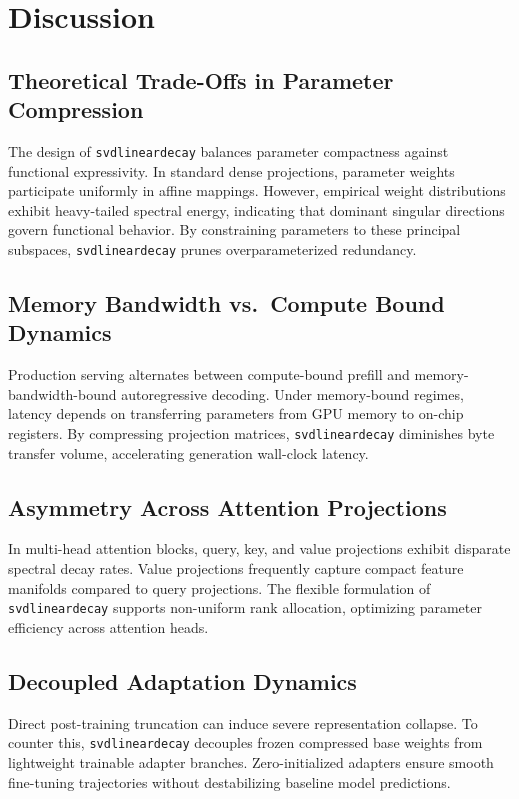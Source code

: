 \section{Discussion}

\subsection{Theoretical Trade-Offs in Parameter Compression}
The design of \texttt{svdlineardecay} balances parameter compactness against functional expressivity. In standard dense projections, parameter weights participate uniformly in affine mappings. However, empirical weight distributions exhibit heavy-tailed spectral energy, indicating that dominant singular directions govern functional behavior. By constraining parameters to these principal subspaces, \texttt{svdlineardecay} prunes overparameterized redundancy.

\subsection{Memory Bandwidth vs.\ Compute Bound Dynamics}
Production serving alternates between compute-bound prefill and memory-bandwidth-bound autoregressive decoding. Under memory-bound regimes, latency depends on transferring parameters from GPU memory to on-chip registers. By compressing projection matrices, \texttt{svdlineardecay} diminishes byte transfer volume, accelerating generation wall-clock latency.

\subsection{Asymmetry Across Attention Projections}
In multi-head attention blocks, query, key, and value projections exhibit disparate spectral decay rates. Value projections frequently capture compact feature manifolds compared to query projections. The flexible formulation of \texttt{svdlineardecay} supports non-uniform rank allocation, optimizing parameter efficiency across attention heads.

\subsection{Decoupled Adaptation Dynamics}
Direct post-training truncation can induce severe representation collapse. To counter this, \texttt{svdlineardecay} decouples frozen compressed base weights from lightweight trainable adapter branches. Zero-initialized adapters ensure smooth fine-tuning trajectories without destabilizing baseline model predictions.

